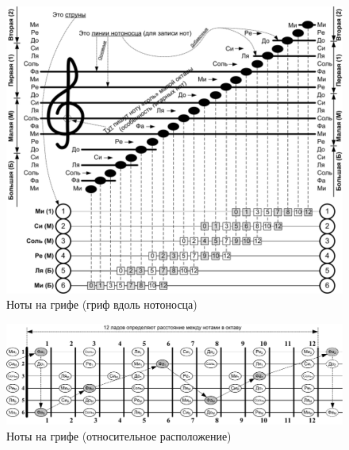 \begin{figure}[!ht]
    \centering
    \includegraphics[width=\textwidth]{fig/lad-by-griph} 
    \caption{Ноты на грифе (гриф вдоль нотоносца)}\label{fig:guitar:lad-by-griph}
\end{figure} 

\begin{figure}[!ht]
    \centering
    \includegraphics[width=\textwidth]{fig/notes-on-griph} 
    \caption{Ноты на грифе (относительное расположение)}\label{fig:guitar:notes-on-griph}
\end{figure} 


